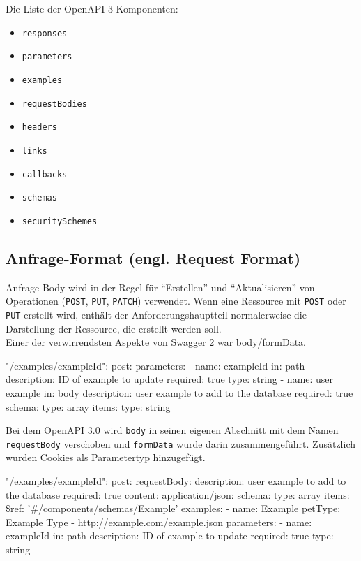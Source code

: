 Die Liste der OpenAPI 3-Komponenten:

\begin{itemize}
	\item \texttt{responses}
	\item \texttt{parameters}
	\item \texttt{examples}
	\item \texttt{requestBodies}
	\item \texttt{headers}
	\item \texttt{links}
	\item \texttt{callbacks}
	\item \texttt{schemas}
	\item \texttt{securitySchemes}\\	
\end{itemize}

\subsection{Anfrage-Format (engl. Request Format)}

Anfrage-Body wird in der Regel für "`Erstellen"' und "`Aktualisieren"' von Operationen (\texttt{POST}, \texttt{PUT}, \texttt{PATCH}) verwendet. Wenn eine Ressource mit \texttt{POST} oder \texttt{PUT} erstellt wird, enthält der Anforderungshauptteil normalerweise die Darstellung der Ressource, die erstellt werden soll\cite{openapirequestbody17}.\\

Einer der verwirrendsten Aspekte von Swagger 2 war body/formData.

\begin{LaTeXCode}[caption={Swagger 2.0 - Anfrage-Format},captionpos=b, label=LaTeXCode:openapi3.0-4][numbers=none]
"/examples/{exampleId}":
post:
parameters:
- name: exampleId
in: path
description: ID of example to update
required: true
type: string
- name: user example
in: body
description: user example to add to the database
required: true
schema:
type: array
items:
type: string
\end{LaTeXCode}

Bei dem OpenAPI 3.0 wird \texttt{body} in seinen eigenen Abschnitt mit dem Namen \texttt{requestBody} verschoben und \texttt{formData} wurde darin zusammengeführt. Zusätzlich wurden Cookies als Parametertyp hinzugefügt.

\begin{LaTeXCode}[caption={Open API 3.0 - Anfrage-Format},captionpos=b, label=LaTeXCode:openapi3.0-5][numbers=none]
"/examples/{exampleId}":
post:
	requestBody:
		description: user example to add to the database
		required: true
		content:
			application/json: 
			 schema:
			  type: array
			  items:
			   \$ref: '#/components/schemas/Example'
			examples:
			 - name: Example
			   petType: Example Type
			 - http://example.com/example.json
	parameters:
	 - name: exampleId
	 in: path
	 description: ID of example to update
	 required: true
	 type: string
\end{LaTeXCode}

